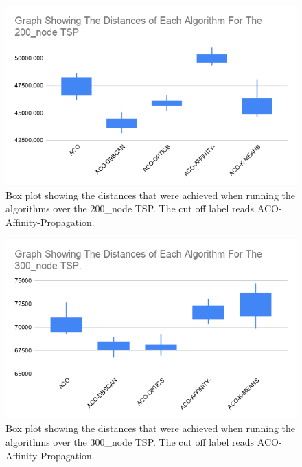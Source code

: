 \begin{figure}
    \centering
    \includegraphics[width=\textwidth]{figures/distance_200_node_graph.png}
    \caption{Box plot showing the distances that were achieved when running the algorithms over the 200\_node TSP. The cut off label reads ACO-Affinity-Propagation.}
    \label{fig:distance_200_node}
\end{figure}

\begin{figure}
    \centering
    \includegraphics[width=\textwidth]{figures/distance_300_node_graph.png}
    \caption{Box plot showing the distances that were achieved when running the algorithms over the 300\_node TSP. The cut off label reads ACO-Affinity-Propagation.}
    \label{fig:distance_300_node}
\end{figure}


